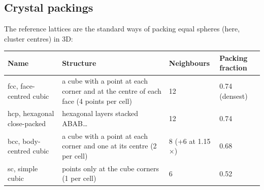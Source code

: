 \documentclass[11pt]{article}
\begin{document}
\subsection*{Crystal packings}
The reference lattices are the standard ways of packing equal spheres (here,
cluster centres) in 3D:
\begin{center}
\begin{tabularx}{\textwidth}{@{}l L l l@{}}
\toprule
Name & Structure & Neighbours & Packing fraction \\
\midrule
fcc, face-centred cubic & a cube with a point at each corner and at the centre of each face (4 points per cell) & 12 & 0.74 (densest) \\
hcp, hexagonal close-packed & hexagonal layers stacked ABAB\dots & 12 & 0.74 \\
bcc, body-centred cubic & a cube with a point at each corner and one at its centre (2 per cell) & 8 (+6 at 1.15$\times$) & 0.68 \\
sc, simple cubic & points only at the cube corners (1 per cell) & 6 & 0.52 \\
\bottomrule
\end{tabularx}
\end{center}
\end{document}
